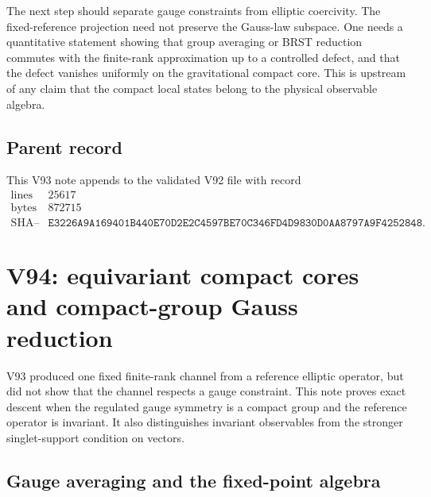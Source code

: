 \documentclass[11pt]{article}
\theoremstyle{remark}
\begin{document}
The next step should separate gauge constraints from elliptic
coercivity.  The fixed-reference projection need not preserve the
Gauss-law subspace.  One needs a quantitative statement showing that
group averaging or BRST reduction commutes with the finite-rank
approximation up to a controlled defect, and that the defect
vanishes uniformly on the gravitational compact core.  This is
upstream of any claim that the compact local states belong to the
physical observable algebra.

\subsection{Parent record}

This V93 note appends to the validated V92 file with record
\[
\begin{array}{c|c}
\text{lines}&25617\\
\text{bytes}&872715\\
\text{SHA--256}&
\texttt{E3226A9A169401B440E70D2E2C4597BE70C346FD4D9830D0AA8797A9F4252848}.
\end{array}
\]



\section{V94: equivariant compact cores and compact-group Gauss
reduction}
\label{sec:v12v94}

V93 produced one fixed finite-rank channel from a reference elliptic
operator, but did not show that the channel respects a gauge
constraint.  This note proves exact descent when the regulated gauge
symmetry is a compact group and the reference operator is invariant.
It also distinguishes invariant observables from the stronger
singlet-support condition on vectors.

\subsection{Gauge averaging and the fixed-point algebra}
\end{document}
